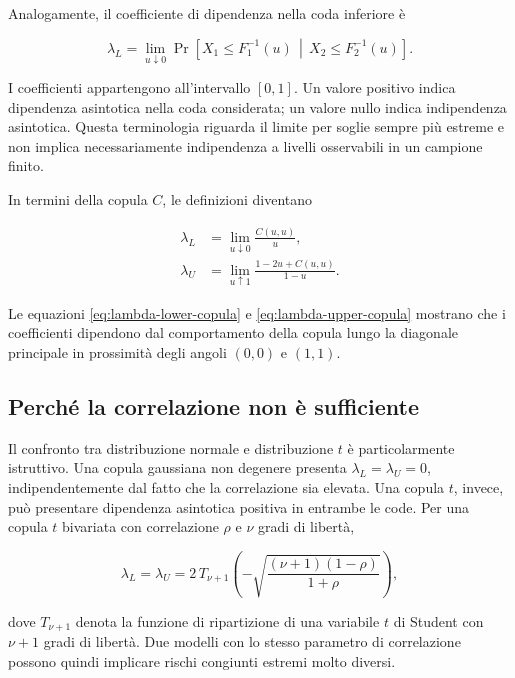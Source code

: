 \documentclass[12pt,a4paper,oneside]{book}
\begin{document}
Analogamente, il coefficiente di dipendenza nella coda inferiore è

\begin{equation}
    \lambda_L
    = \lim_{u\downarrow 0}
    \Pr\!\left[
        X_1\leq F_1^{-1}(u)
        \,\middle|\,
        X_2\leq F_2^{-1}(u)
    \right].
    \label{eq:lambda-lower-def}
\end{equation}

I coefficienti appartengono all'intervallo $[0,1]$. Un valore positivo indica
dipendenza asintotica nella coda considerata; un valore nullo indica
indipendenza asintotica. Questa terminologia riguarda il limite per soglie
sempre più estreme e non implica necessariamente indipendenza a livelli
osservabili in un campione finito.

In termini della copula $C$, le definizioni diventano

\begin{align}
    \lambda_L
    &= \lim_{u\downarrow 0}\frac{C(u,u)}{u},
    \label{eq:lambda-lower-copula}\\
    \lambda_U
    &= \lim_{u\uparrow 1}
       \frac{1-2u+C(u,u)}{1-u}.
    \label{eq:lambda-upper-copula}
\end{align}

Le equazioni \eqref{eq:lambda-lower-copula} e
\eqref{eq:lambda-upper-copula} mostrano che i coefficienti dipendono dal
comportamento della copula lungo la diagonale principale in prossimità degli
angoli $(0,0)$ e $(1,1)$.

\subsection{Perché la correlazione non è sufficiente}

Il confronto tra distribuzione normale e distribuzione $t$ è particolarmente
istruttivo. Una copula gaussiana non degenere presenta
$\lambda_L=\lambda_U=0$, indipendentemente dal fatto che la correlazione sia
elevata. Una copula $t$, invece, può presentare dipendenza asintotica positiva
in entrambe le code. Per una copula $t$ bivariata con correlazione $\rho$ e
$\nu$ gradi di libertà,

\begin{equation}
    \lambda_L=\lambda_U
    =2\,T_{\nu+1}\!\left(
        -\sqrt{\frac{(\nu+1)(1-\rho)}{1+\rho}}
    \right),
    \label{eq:t-copula-tail-dependence}
\end{equation}

dove $T_{\nu+1}$ denota la funzione di ripartizione di una variabile $t$ di
Student con $\nu+1$ gradi di libertà. Due modelli con lo stesso parametro di
correlazione possono quindi implicare rischi congiunti estremi molto diversi.
\end{document}
